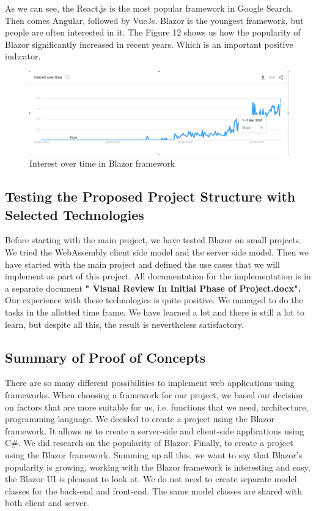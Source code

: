 \documentclass{scrartcl}
\begin{document}
As we can see, the React.js is the most popular framework in Google Search. Then comes Angular, followed by VueJs.
 Blazor is the youngest framework, but people are often interested in it.
The Figure 12 shows us how the popularity of Blazor significantly increased in recent years. Which is an important positive indicator.


 \begin{figure}[H]
\centering
\includegraphics[width=150mm]{graph/interest-blazor.JPG}
\caption{Interest over time in Blazor framework}
\label{blabla}
\end{figure}


\subsection{Testing the Proposed Project Structure with Selected Technologies}
Before starting with the main project, we have tested Blazor on small projects. We tried the WebAssembly client side model and the server side model. 
Then we have started with the main project and defined the use cases that we will implement as part of this project. All documentation for the implementation is in a separate document \textbf{" Visual Review In Initial Phase of Project.docx".}\\
Our experience with these technologies is quite positive. We managed to do the tasks in the allotted time frame. We have learned a lot and there is still a lot to learn, but despite all this, the result is nevertheless satisfactory.

\newpage
\subsection{Summary of Proof of Concepts }


There are so many different possibilities to implement web applications using frameworks.
When choosing a framework for our project, we based our decision on factors that are more suitable for us, i.e. functions that we need, architecture, programming language.
We decided to create a project using the Blazor framework. It allows us to create a server-side and client-side applications using  C\#. 
We did research on the popularity of Blazor. Finally, to create a project using the Blazor framework. Summing up all this, we want to say that Blazor's popularity is growing, working with the Blazor framework is interesting and easy,  the Blazor UI is pleasant to look at. We do not need to create separate model classes for the back-end and front-end. The same model classes are shared with both client and server. 
\\
\end{document}
